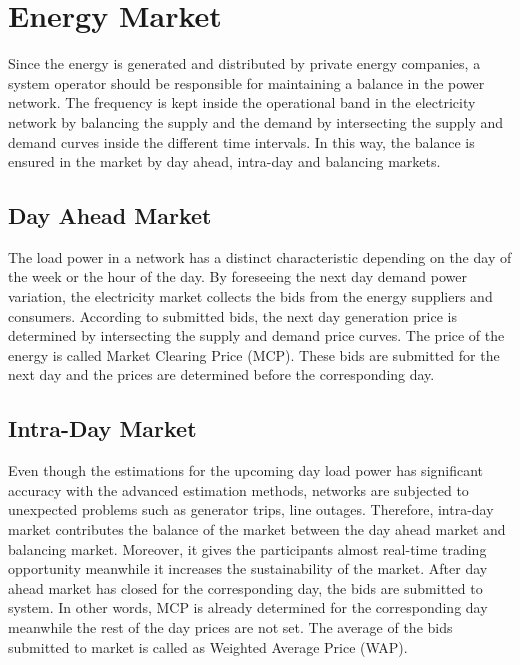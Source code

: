 \section{Energy Market}
Since the energy is generated and distributed by private energy companies, a system operator should be responsible for maintaining a balance in the power network. The frequency is kept inside the operational band in the electricity network by balancing the supply and the demand by intersecting the supply and demand curves inside the different time intervals. In this way, the balance is ensured in the market by day ahead, intra-day and balancing markets. 
\subsection{Day Ahead Market}
The load power in a network has a distinct characteristic depending on the day of the week or the hour of the day. By foreseeing the next day demand power variation, the electricity market collects the bids from the energy suppliers and consumers. According to submitted bids, the next day generation price is determined by intersecting the supply and demand price curves. The price of the energy is called Market Clearing Price (MCP). These bids are submitted for the next day and the prices are determined before the corresponding day.
\subsection{Intra-Day Market}
Even though the estimations for the upcoming day load power has significant accuracy with the advanced estimation methods, networks are subjected to unexpected problems such as generator trips, line outages. Therefore, intra-day market contributes the balance of the market between the day ahead market and balancing market. Moreover, it gives the participants almost real-time trading opportunity meanwhile it increases the sustainability of the market. After day ahead market has closed for the corresponding day, the bids are submitted to system. In other words, MCP is already determined for the corresponding day meanwhile the rest of the day prices are not set. The average of the bids submitted to market is called as Weighted Average Price (WAP).
